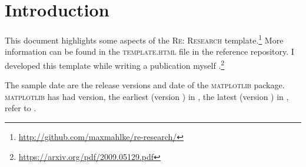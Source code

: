 
\section{Introduction}%
\label{sec:introduction}%

This document highlights some aspects of the \textsc{Re: Research}
template.\footnote{\url{http://github.com/maxmahlke/re-research/}}
More information can be found in the \textsc{template.html} file in
the reference repository. I developed this template while writing a
publication myself \citep{2009.05129v1}.\footnote{\url{https://arxiv.org/pdf/2009.05129.pdf}}

The sample date are the release versions and date of the \textsc{matplotlib} package.
\textsc{matplotlib} has had \NVersions version, the earliest (version \VersionEarliest) in
\VersionEarliestDate, the latest (version \VersionLatest) in \VersionLatestDate, refer to .

